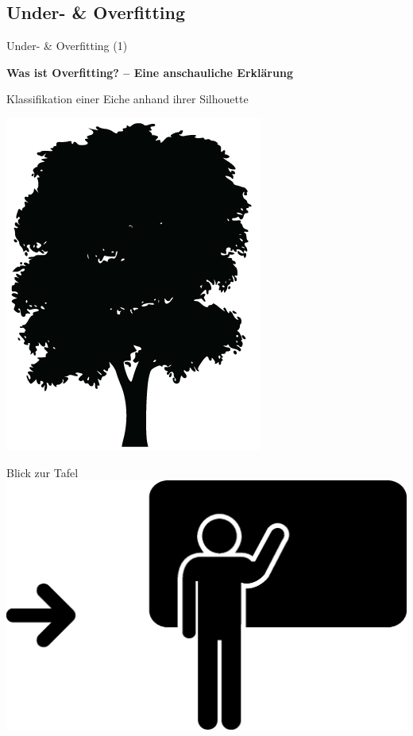 \subsection{Under- \& Overfitting}

\begin{frame}{Under- \& Overfitting (1)}

\textbf{Was ist Overfitting? -- Eine anschauliche Erklärung}

Klassifikation einer Eiche anhand ihrer Silhouette

\pause

\begin{center}
    \includegraphics[height=0.9\textheight]{src/baumsilhouette}
\end{center}


\end{frame}



\begin{frame}{Blick zur Tafel}
\centering
\includegraphics[width=\linewidth]{src/blackboard}
\end{frame}



